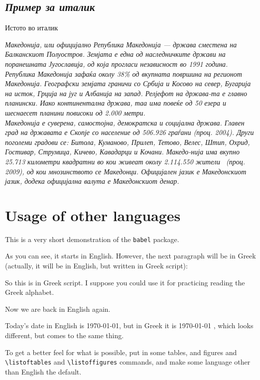 \documentclass[a4paper]{report}
\begin{document}
\section{\emph{Пример за италик}}
Истото во италик

\emph{Македонија, или официјално Република Македонија — држава сместена на Балканскиот Полуостров. Земјата е една од наследничките држави на поранешната Југославија, од која прогласи независност во 1991 година. Република Македонија зафаќа околу 38\% од вкупната површина на регионот Македонија. Географски земјата граничи со Србија и Косово на север, Бугарија на исток, Грција на југ и Албанија на запад. Релјефот на држава-та е главно планински. Иако континентална држава, таа има повеќе од 50 езера и шеснаесет планини повисоки од 2.000 метри.\\
Македонија е суверена, самостојна, демократска и социјална држава. Главен град на државата е Скопје со население од 506.926 граѓани (проц. 2004). Други поголеми градови се: Битола, Куманово, Прилеп, Тетово, Велес, Штип, Охрид, Гостивар, Струмица, Кичево, Кавадарци и Кочани. Македо-нија има вкупно 25.713 километри квадратни во кои живеат околу 2.114.550 жители~\cite{website:ExampleWeb} (проц. 2009), од кои мнозинството се Македонци. Официјален јазик е Македонскиот јазик, додека официјална валута е Македонскиот денар.}

\chapter{Usage of other languages}

This is a very short demonstration of the \texttt{babel} package.

As you can see, it starts in English. However, the next paragraph will
be in Greek (actually, it will be in English, but written in Greek
script):



So this is in Greek script. I suppose you could use it for practicing
reading the  Greek alphabet.


Now we are back in English again.

Today's date in English is \today, but in Greek it is 
\today
{}, which looks different, but comes to the same
thing.

To get a better feel for what is possible, put in some tables,
and figures and \verb+\listoftables+ and \verb+\listoffigures+
commands, and make some language other than 
English the default.
\end{document}

